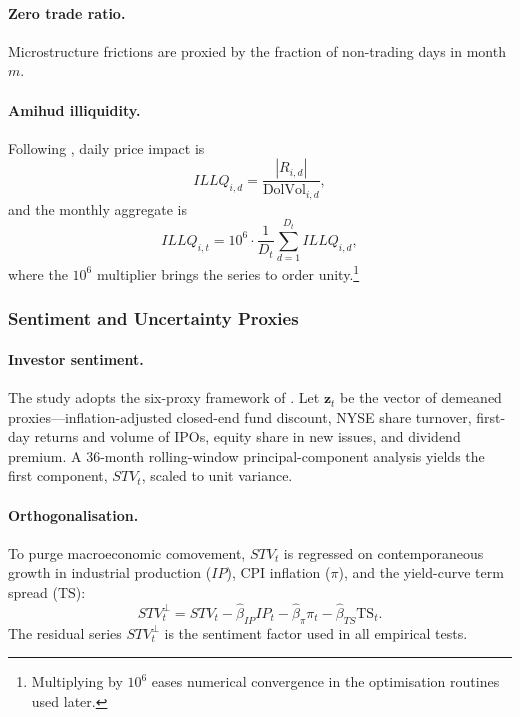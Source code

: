 \paragraph{Zero trade ratio.}  Microstructure frictions are proxied by
the fraction of non-trading days in month \(m\).

\paragraph{Amihud illiquidity.}  Following , daily price impact is
\[
ILLQ_{i,d}=\frac{|R_{i,d}|}{\text{DolVol}_{i,d}},
\]
and the monthly aggregate is
\[
ILLQ_{i,t}=10^{6}\cdot \frac{1}{D_t}\sum_{d=1}^{D_t} ILLQ_{i,d},
\]
where the \(10^{6}\) multiplier brings the series to order unity.\footnote{Multiplying by \(10^{6}\) eases numerical convergence in the optimisation routines used later.}

\subsubsection{Sentiment and Uncertainty Proxies}\label{sec:sentiment}

\paragraph{Investor sentiment.}  The study adopts the six-proxy framework of .  Let \(\mathbf{z}_{t}\) be the vector of demeaned proxies—inflation-adjusted closed-end fund discount, NYSE share turnover, first-day returns and volume of IPOs, equity share in new issues, and dividend premium.  A 36-month rolling-window principal-component analysis yields the first component, \(STV_{t}\), scaled to unit variance.

\paragraph{Orthogonalisation.}  To purge macroeconomic comovement, \(STV_{t}\) is regressed on contemporaneous growth in industrial production (\(IP\)), CPI inflation (\(\pi\)), and the yield-curve term spread (\(\text{TS}\)):
\[
STV_{t}^{\perp}=STV_{t}-\widehat{\beta}_{IP}IP_{t}
                    -\widehat{\beta}_{\pi}\pi_{t}
                    -\widehat{\beta}_{TS}\text{TS}_{t}.
\]
The residual series \(STV_{t}^{\perp}\) is the sentiment factor used in all empirical tests.

